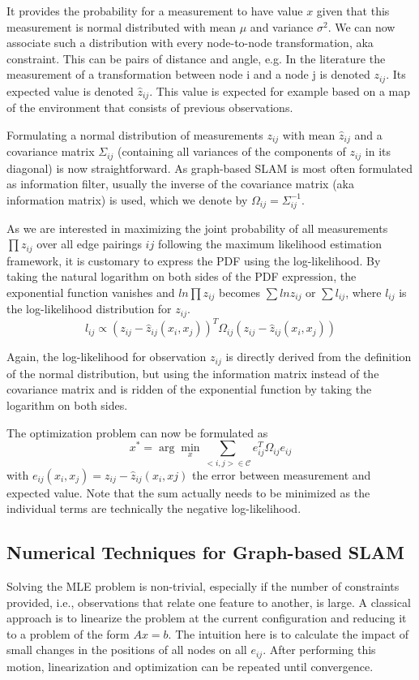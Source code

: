 \documentclass[paper=6.14in:9.21in,pagesize=pdftex,11pt,twoside,openright]{scrbook}
\begin{document}
It provides the probability for a measurement to have value $ x$ given that this measurement is normal distributed with mean $ \mu$ and variance $ \sigma^2$.  We can now associate such a distribution with every node-to-node transformation, aka constraint. This can be pairs of distance and angle, e.g. In the literature the measurement of a transformation between node i and a node j is denoted $ z_{ij}$. Its expected value is denoted $ \hat{z}_{ij}$. This value is expected for example based on a map of the environment that consists of previous observations.

Formulating a normal distribution of measurements $ z_{ij}$ with mean $ \hat{z}_{ij}$ and a covariance matrix $ \Sigma_{ij}$ (containing all variances of the components of $ z_{ij}$ in its diagonal) is now straightforward. As graph-based SLAM is most often formulated as  information filter, usually the inverse of the covariance matrix (aka information matrix) is used, which we denote by $ \Omega_{ij}=\Sigma_{ij}^{-1}$.

As we are interested in maximizing the joint probability of all measurements $ \prod{z_{ij}}$ over all edge pairings $ ij$ following the maximum likelihood estimation framework, it is customary to express the PDF using the log-likelihood. By taking the natural logarithm on both sides of the PDF expression, the exponential function vanishes and $ ln \prod{z_{ij}}$ becomes $ \sum{ ln z_{ij}}$ or $ \sum{l_{ij}}$, where $ l_{ij}$ is the log-likelihood distribution for $ z_{ij}$.
\begin{equation}
l_{ij} \propto (z_{ij}-\hat{z}_{ij}(x_i,x_j))^T\Omega_{ij}(z_{ij}-\hat{z}_{ij}(x_i,x_j))
\end{equation}

Again, the log-likelihood for observation $ z_{ij}$ is directly derived from the definition of the normal distribution, but using the information matrix instead of the covariance matrix and is ridden of the exponential function by taking the logarithm on both sides.

The optimization problem can now be formulated as
\begin{equation}
x^* = \arg \min_{x}\sum_{<i,j>\in \mathcal{C}}e_{ij}^T\Omega_{ij}e_{ij}
\end{equation}
with $ e_{ij}(x_i,x_j)=z_{ij}-\hat{z}_{ij}(x_i,xj)$ the error between measurement and expected value. Note that the sum actually needs to be minimized as the individual terms are technically the negative log-likelihood.

\subsection{Numerical Techniques for Graph-based SLAM}
Solving the MLE problem is non-trivial, especially if the number of constraints provided, i.e., observations that relate one feature to another, is large. A classical approach is to linearize the problem at the current configuration and reducing it to a problem of the form $ Ax=b$. The intuition here is to calculate the impact of small changes in the positions of all nodes on all $ e_{ij}$. After performing this motion, linearization and optimization can be  repeated until convergence.
\end{document}
